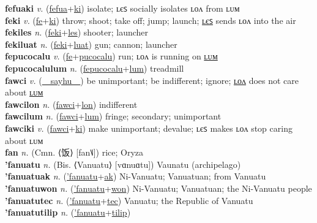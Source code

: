 \textbf{fefuaki} \textit{v.} (\hyperref[fefua]{fefua}+\hyperref[ki]{ki})
isolate; ʟєꜱ socially isolates ʟᴏᴧ from ʟᴜᴍ \label{fefuaki} \\
\textbf{feki} \textit{v.} (\hyperref[fe]{fe}+\hyperref[ki]{ki})
throw; shoot; take off; jump; launch; \hyperref[fekiles]{ʟєꜱ} sends ʟᴏᴧ into the air \label{feki} \\
\textbf{fekiles} \textit{n.} (\hyperref[feki]{feki}+\hyperref[les]{les})
shooter; launcher \label{fekiles} \\
\textbf{fekiluat} \textit{n.} (\hyperref[feki]{feki}+\hyperref[luat]{luat})
gun; cannon; launcher \label{fekiluat} \\
\textbf{fepucocalu} \textit{v.} (\hyperref[fe]{fe}+\hyperref[pucocalu]{pucocalu})
run; ʟᴏᴧ is running on \hyperref[fepucocalulum]{ʟᴜᴍ} \label{fepucocalu} \\
\textbf{fepucocalulum} \textit{n.} (\hyperref[fepucocalu]{fepucocalu}+\hyperref[lum]{lum})
treadmill \label{fepucocalulum} \\
\textbf{fawci} \textit{v.} (\hyperref[sayhu]{~~sayhu~~})
be unimportant; be indifferent; ignore; \hyperref[fawcilon]{ʟᴏᴧ} does not care about \hyperref[fawcilum]{ʟᴜᴍ} \label{fawci} \\
\textbf{fawcilon} \textit{n.} (\hyperref[fawci]{fawci}+\hyperref[lon]{lon})
indifferent \label{fawcilon} \\
\textbf{fawcilum} \textit{n.} (\hyperref[fawci]{fawci}+\hyperref[lum]{lum})
fringe; secondary; unimportant \label{fawcilum} \\
\textbf{fawciki} \textit{v.} (\hyperref[fawci]{fawci}+\hyperref[ki]{ki})
make unimportant; devalue; ʟєꜱ makes ʟᴏᴧ stop caring about ʟᴜᴍ \label{fawciki} \\
\textbf{fan} \textit{n.} (Cmn. ⟨饭⟩ [fan˥˩])
rice; Oryza \label{fan} \\
\textbf{'fanuatu} \textit{n.} (Bis. ⟨Vanuatu⟩ [vɑnuɑtu])
Vaunatu (archipelago) \label{'fanuatu} \\
\textbf{'fanuatuak} \textit{n.} (\hyperref['fanuatu]{'fanuatu}+\hyperref[ak]{ak})
Ni-Vanuatu; Vanuatuan; from Vanuatu \label{'fanuatuak} \\
\textbf{'fanuatuwon} \textit{n.} (\hyperref['fanuatu]{'fanuatu}+\hyperref[won]{won})
Ni-Vanuatu; Vanuatuan; the Ni-Vanuatu people \label{'fanuatuwon} \\
\textbf{'fanuatutec} \textit{n.} (\hyperref['fanuatu]{'fanuatu}+\hyperref[tec]{tec})
Vanuatu; the Republic of Vanuatu \label{'fanuatutec} \\
\textbf{'fanuatutilip} \textit{n.} (\hyperref['fanuatu]{'fanuatu}+\hyperref[tilip]{tilip})
